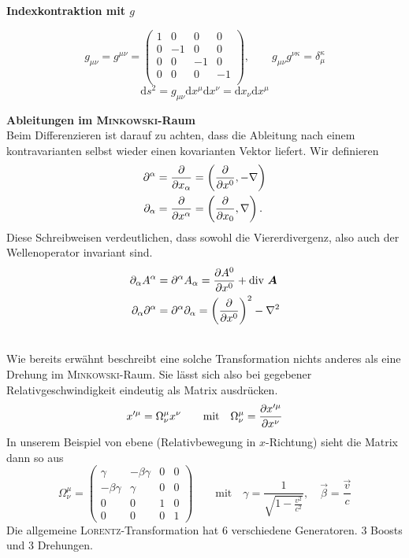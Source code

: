\textbf{Indexkontraktion mit $g$}

\begin{equation*}
g_{\mu\nu}=g^{\mu\nu}=\begin{pmatrix}
1 & 0& 0 & 0 \\
0 &-1& 0 & 0\\
0 & 0 & -1 & 0 \\
0 & 0 & 0 & -1 \\
\end{pmatrix}, \qquad g_{\mu\nu}g^{\nu\kappa}=\delta_\mu^\kappa
\end{equation*}
\begin{equation*}
\mathrm{d}s^2 = g_{\mu\nu}\mathrm{d}x^\mu\mathrm{d}x^\nu=\mathrm{d}x_\nu\mathrm{d}x^\mu
\end{equation*}

\textbf{Ableitungen im \textsc{Minkowski}-Raum}\\

Beim Differenzieren ist darauf zu achten, dass die Ableitung nach einem kontravarianten selbst wieder einen kovarianten Vektor liefert. Wir definieren
\begin{align*}
\partial^\alpha &= \frac{\partial{}}{\partial{x_\alpha}}=\left(\frac{\partial{}}{\partial{x^0}},-\nabla\right)\\
\partial_\alpha &= \frac{\partial{}}{\partial{x^\alpha}}=\left(\frac{\partial{}}{\partial{x_0}},\nabla\right).
\end{align*}
Diese Schreibweisen verdeutlichen, dass sowohl die Viererdivergenz, also auch der Wellenoperator invariant sind.
\begin{align*}
\partial_\alpha A^\alpha &= \partial^\alpha A_\alpha =\frac{\partial{A^0}}{\partial{x^0}}+\text{div }\bm{A}\\
\partial_\alpha\partial^\alpha&=\partial^\alpha\partial_\alpha = \left(\frac{\partial{}}{\partial{x^0}}\right)^2-\nabla^2
\end{align*}

\\

Wie bereits erwähnt beschreibt eine solche Transformation nichts anderes als eine Drehung im \textsc{Minkowski}-Raum. Sie lässt sich also bei gegebener Relativgeschwindigkeit eindeutig als Matrix ausdrücken.
\begin{equation*}
x'^\mu = \Omega_\nu^\mu x^\nu \qquad \text{mit}\quad \Omega_\nu^\mu = \frac{\partial{x'^\mu}}{\partial{x^\nu}}
\end{equation*}
In unserem Beispiel von ebene (Relativbewegung in $x$-Richtung) sieht die Matrix dann so aus
\begin{equation*}
\Omega_\nu^\mu = \begin{pmatrix}
\gamma &-\beta\gamma & 0 & 0 \\
-\beta\gamma & \gamma & 0 & 0 \\
0 & 0 & 1 & 0\\
0 & 0 & 0 & 1
\end{pmatrix}  \qquad \text{mit}\quad \gamma=\frac{1}{\sqrt{1-\frac{v^2}{c^2}}}, \quad \vec{\beta} = \frac{\vec{v}}{c}
\end{equation*}
Die allgemeine \textsc{Lorentz}-Transformation hat 6 verschiedene Generatoren. 3 Boosts und 3 Drehungen.
\newpage
